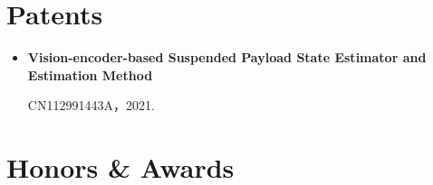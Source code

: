 \documentclass[11pt,a4paper,sans]{moderncv}        %
\begin{document}
\section{Patents}

\vspace{5pt}

\begin{itemize}

    \item{\textbf{Vision-encoder-based Suspended Payload State Estimator and Estimation Method}
    
    CN112991443A，2021.
    }

\end{itemize}

\section{Honors \& Awards}

\vspace{6pt}
\end{document}
